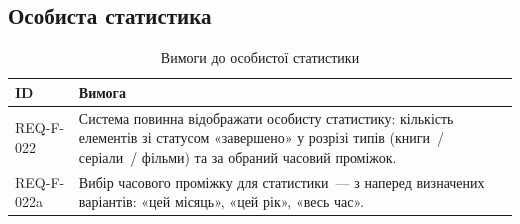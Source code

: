 \subsection{Особиста статистика}

\begin{table}[h]
\caption{Вимоги до особистої статистики}
\label{tab:stat}
\begin{tabular}{L{2.5cm} L{11.5cm}}
\toprule
\textbf{ID} & \textbf{Вимога} \\
\midrule
REQ-F-022 & Система повинна відображати особисту статистику: кількість елементів зі статусом «завершено» у розрізі типів (книги~/ серіали~/ фільми) та за обраний часовий проміжок.  \\
\addlinespace
REQ-F-022a & Вибір часового проміжку для статистики~--- з наперед визначених варіантів: «цей місяць», «цей рік», «весь час».  \\
\bottomrule
\end{tabular}
\end{table}
